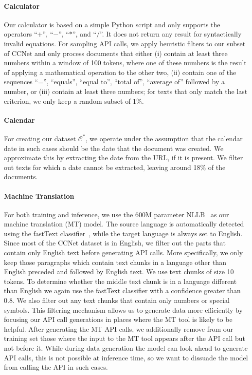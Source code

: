 \documentclass[11pt]{article}
\begin{document}
\begin{CJK*}{UTF8}{gbsn}
\paragraph{Calculator} Our calculator is based on a simple Python script and only supports the operators ``$+$'', ``$-$'', ``$*$'', and ``$/$''. It does not return any result for syntactically invalid equations. For sampling API calls, we apply heuristic filters to our subset of CCNet and only process documents that either (i) contain at least three numbers within a window of 100 tokens, where one of these numbers is the result of applying a mathematical operation to the other two, (ii) contain one of the sequences ``='', ``equals'', ``equal to'', ``total of'', ``average of'' followed by a number, or (iii) contain at least three numbers; for texts that only match the last criterion, we only keep a random subset of 1\%.

\paragraph{Calendar} For creating our dataset $\mathcal{C}^*$, we operate under the assumption that the calendar date in such cases should be the date that the document was created. We approximate this by extracting the date from the URL, if it is present. We filter out texts for which a date cannot be extracted, leaving around 18\% of the documents.

\paragraph{Machine Translation} For both training and inference, we use the 600M parameter NLLB~\citep{costa2022no} as our machine translation (MT) model. The source language is automatically detected using the fastText classifier~\citep{joulin2016fasttext}, while the target language is always set to English. Since most of the CCNet dataset is in English, we filter out the parts that contain only English text before generating API calls. More specifically, we only keep those paragraphs which contain text chunks in a language other than English preceded and followed by English text. We use text chunks of size 10 tokens. To determine whether the middle text chunk is in a language different than English we again use the fastText classifier with a confidence greater than 0.8. We also filter out any text chunks that contain only numbers or special symbols. This filtering mechanism allows us to generate data more efficiently by focusing our API call generations in places where the MT tool is likely to be helpful. After generating the MT API calls, we additionally remove from our training set those where the input to the MT tool appears after the API call but not before it. While during data generation the model can look ahead to generate API calls, this is not possible at inference time, so we want to dissuade the model from calling the API in such cases. 




\end{CJK*}
\end{document}
